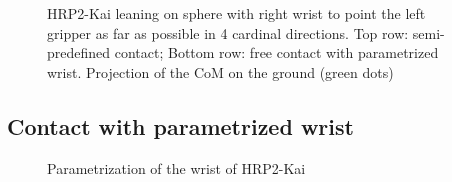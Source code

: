 \begin{figure}
\centering
  \centering
  \setlength\fboxsep{0pt}
  \setlength\fboxrule{1pt}
  \caption{HRP2-Kai leaning on sphere with right wrist to point the left gripper as far as possible in 4 cardinal directions.
  Top row: semi-predefined contact; Bottom row: free contact with parametrized wrist.
  Projection of the CoM on the ground (green dots)}
\label{fig:contact_plan_sphere}
\end{figure}

\subsection{Contact with parametrized wrist}

\begin{figure}[!htb]
\centering
  \centering
  \setlength\fboxsep{0pt}
  \setlength\fboxrule{1pt}
\caption{Parametrization of the wrist of HRP2-Kai}
\label{fig:param_wrist_detail}
\end{figure}

